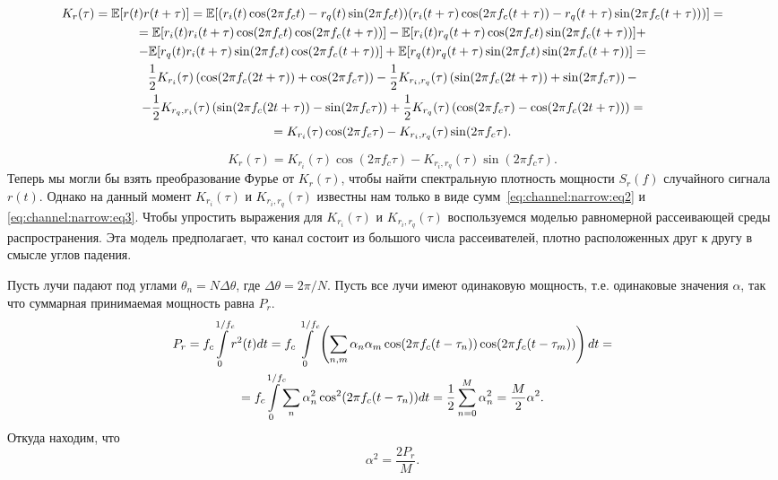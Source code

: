 \documentclass{book}
\numberwithin{theorem}{chapter}
\numberwithin{statement}{chapter}
\numberwithin{lemma}{chapter}
\theoremstyle{definition}
\numberwithin{task}{chapter}
\theoremstyle{remark}
\numberwithin{example}{chapter}
\theoremstyle{definition}
\numberwithin{definition}{chapter}
\theoremstyle{remark}
\theoremstyle{remark}
\numberwithin{lyrics}{section}
\begin{document}
\begin{gather*}
K_r(\tau) = \mathbb{E}[r(t) r(t + \tau)] = \mathbb{E}[(r_i(t) \cos (2\pi f_c t) - r_q(t) \sin (2\pi f_c t))(r_i(t + \tau) \cos (2\pi f_c (t + \tau)) - r_q(t + \tau) \sin (2\pi f_c (t + \tau)))] = \\
= \mathbb{E}[r_i(t) r_i(t + \tau) \cos(2\pi f_c t) \cos(2\pi f_c (t + \tau))]  
- \mathbb{E}[r_i(t) r_q(t + \tau) \cos(2\pi f_c t) \sin (2 \pi f_c (t + \tau))] + \\
- \mathbb{E}[r_q(t) r_i(t + \tau) \sin(2\pi f_c t) \cos (2\pi f_c (t + \tau))] 
+ \mathbb{E}[r_q(t) r_q(t + \tau) \sin(2\pi f_c t) \sin (2 \pi f_c (t + \tau))] = \\
\frac{1}{2} K_{r_i}(\tau) \left(\cos(2\pi f_c (2 t + \tau)) + \cos(2\pi f_c \tau) \right) - 
\frac{1}{2} K_{r_i, r_q}(\tau) \left(\sin(2\pi f_c (2t + \tau)) + \sin(2\pi f_c \tau)\right) - \\
- \frac{1}{2}  K_{r_q, r_i}(\tau) \left(\sin (2\pi f_c(2t + \tau)) - \sin(2\pi f_c \tau)\right) +
 \frac{1}{2}  K_{r_q}(\tau) \left(\cos(2\pi f_c \tau) - \cos(2\pi f_c (2t + \tau))\right) = \\
 = K_{r_i}(\tau) \cos(2\pi f_c \tau) - K_{r_i, r_q}(\tau) \sin (2\pi f_c \tau).
\end{gather*}

\begin{equation}
\label{eq:channel:narrow:eq6}
K_r(\tau) = K_{r_i}(\tau) \cos(2\pi f_c \tau) - K_{r_i, r_q}(\tau) \sin (2\pi f_c \tau).
\end{equation}
Теперь мы могли бы взять преобразование Фурье от $K_r(\tau)$, чтобы найти спектральную плотность мощности $S_r(f)$ случайного сигнала $r(t)$. Однако на данный момент $K_{r_i}(\tau)$ и $K_{r_i, r_q}(\tau)$ известны нам только в виде сумм~\eqref{eq:channel:narrow:eq2} и \eqref{eq:channel:narrow:eq3}. Чтобы упростить выражения для $K_{r_i}(\tau)$ и $K_{r_i, r_q}(\tau)$ воспользуемся моделью равномерной рассеивающей среды распространения.  Эта модель предполагает, что канал состоит из большого числа рассеивателей, плотно расположенных друг к другу в смысле углов падения. 



Пусть лучи падают под углами $\theta_n = N \Delta \theta$, где $\Delta \theta = 2 \pi / N$. Пусть все лучи имеют одинаковую мощность, т.е. одинаковые значения $\alpha$, так что суммарная принимаемая мощность равна $P_r$. 
\begin{gather*}
P_r = f_c \Int_{0}^{\mathclap{1/f_c}} r^2(t) dt = f_c \Int_{0}^{1/f_c} \left(\Sum_{n, m} \alpha_n\alpha_m \cos(2\pi f_c (t - \tau_n))\cos(2\pi f_c (t - \tau_m))\right) dt = \\ = f_c \Int_{0}^{\mathclap{1/f_c}}  \Sum_n \alpha_n^2 \cos^2(2\pi f_c (t - \tau_n)) dt = \frac{1}{2} \Sum_{n=0}^M \alpha_n^2 = \frac{M}{2}\alpha^2. 
\end{gather*}
Откуда находим, что
$$
\alpha^2 = \frac{2 P_r}{M}.
$$
\end{document}

